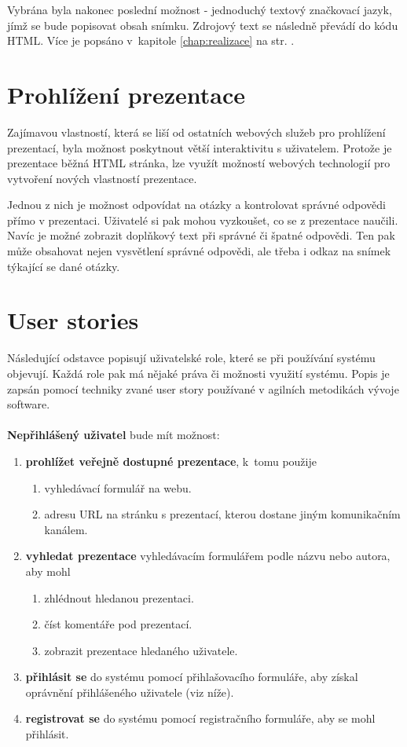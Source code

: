 \documentclass[11pt,twoside,a4paper]{book}
\begin{document}
Vybrána byla nakonec poslední možnost - jednoduchý textový značkovací jazyk, jímž se bude popisovat obsah snímku. Zdrojový text se následně převádí do kódu HTML. Více je popsáno v~kapitole \ref{chap:realizace}  na str. \pageref{chap:realizace}.

\section{Prohlížení prezentace}
Zajímavou vlastností, která se liší od ostatních webových služeb pro prohlížení prezentací, byla možnost poskytnout větší interaktivitu s uživatelem. Protože je prezentace běžná HTML stránka, lze využít možností webových technologií pro vytvoření nových vlastností prezentace.

Jednou z nich je možnost odpovídat na otázky a kontrolovat správné odpovědi přímo v prezentaci. Uživatelé si pak mohou vyzkoušet, co se z prezentace naučili. Navíc je možné zobrazit doplňkový text při správné či špatné odpovědi. Ten pak může obsahovat nejen vysvětlení správné odpovědi, ale třeba i odkaz na snímek týkající se dané otázky.


\section{User stories}\label{chap:userstory}
Následující odstavce popisují uživatelské role, které se při používání systému objevují. Každá role pak má nějaké práva či možnosti využití systému. Popis je zapsán pomocí techniky zvané user story používané v agilních metodikách vývoje software. \\\\

\noindent \textbf{Nepřihlášený uživatel} bude mít možnost:
\begin{enumerate}
	\item \textbf{prohlížet veřejně dostupné prezentace}, k~tomu použije 
		\begin{enumerate}[label*=\arabic*.]
			\item vyhledávací formulář na webu.
			\item adresu URL na stránku s prezentací, kterou dostane jiným komunikačním kanálem.
		\end{enumerate}
	\item \textbf{vyhledat prezentace} vyhledávacím formulářem podle názvu nebo autora, aby mohl
		\begin{enumerate}[label*=\arabic*.]
			\item zhlédnout hledanou prezentaci.
			\item číst komentáře pod prezentací.
			\item zobrazit prezentace hledaného uživatele.
		\end{enumerate}
	\item \textbf{přihlásit se} do systému pomocí přihlašovacího formuláře, aby získal oprávnění přihlášeného uživatele (viz níže).
	\item \textbf{registrovat se} do systému pomocí registračního formuláře, aby se mohl přihlásit.
\end{enumerate}
\end{document}
